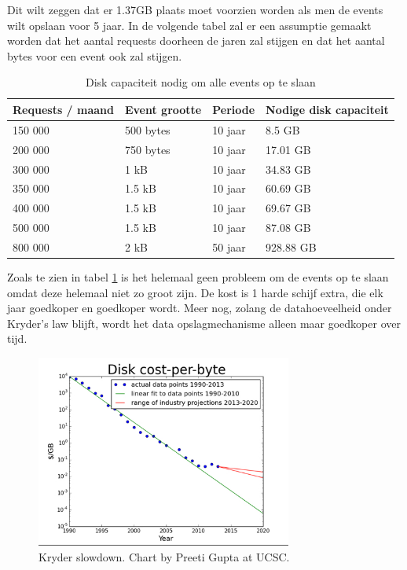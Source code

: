 Dit wilt zeggen dat er 1.37GB plaats moet voorzien worden als men de events wilt opslaan voor 5 jaar. In de volgende tabel zal er een assumptie gemaakt worden dat het aantal requests doorheen de jaren zal stijgen en dat het aantal bytes voor een event ook zal stijgen.

\begin{table}[h]
\centering
\caption[Disk capaciteit nodig om alle events op te slaan]{Disk capaciteit nodig om alle events op te slaan\footnotemark}
\begin{tabular}{@{}llll@{}}
\toprule
Requests / maand & Event grootte & Periode & Nodige disk capaciteit \\ \midrule
150 000 & 500 bytes & 10 jaar & 8.5 GB \\
200 000 & 750 bytes & 10 jaar & 17.01 GB \\
300 000 & 1 kB & 10 jaar & 34.83 GB \\
350 000 & 1.5 kB & 10 jaar & 60.69 GB \\
400 000 & 1.5 kB & 10 jaar & 69.67 GB \\
500 000 & 1.5 kB & 10 jaar & 87.08 GB \\ \midrule
800 000 & 2 kB & 50 jaar & 928.88 GB \\ \bottomrule
\end{tabular}
\label{disk-capaciteit}
\end{table}


Zoals te zien in tabel \ref{disk-capaciteit} is het helemaal geen probleem om de events op te slaan omdat deze helemaal niet zo groot zijn. De kost is 1 harde schijf extra, die elk jaar goedkoper en goedkoper wordt. Meer nog, zolang de datahoeveelheid onder Kryder’s law blijft, wordt het data opslagmechanisme alleen maar goedkoper over tijd.

\begin{figure}[h]
\caption{Kryder slowdown. Chart by Preeti Gupta at UCSC.}
\centering
\includegraphics[width=0.75\textwidth]{img/kryder-slowdown}
\end{figure}

